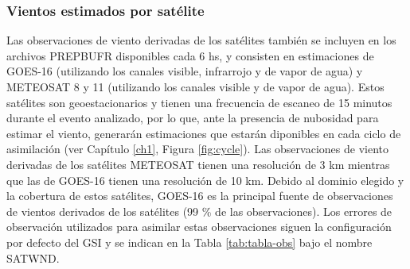 \documentclass[12pt,oneside,a4paper]{reedthesis}
\begin{document}
\hypertarget{vientos-estimados-por-satuxe9lite}{%
\subsubsection{Vientos estimados por satélite}\label{vientos-estimados-por-satuxe9lite}}

Las observaciones de viento derivadas de los satélites también se incluyen en los archivos PREPBUFR disponibles cada 6 hs, y consisten en estimaciones de GOES-16 (utilizando los canales visible, infrarrojo y de vapor de agua) y METEOSAT 8 y 11 (utilizando los canales visible y de vapor de agua). Estos satélites son geoestacionarios y tienen una frecuencia de escaneo de 15 minutos durante el evento analizado, por lo que, ante la presencia de nubosidad para estimar el viento, generarán estimaciones que estarán diponibles en cada ciclo de asimilación (ver Capítulo \ref{ch1}, Figura \ref{fig:cycle}). Las observaciones de viento derivadas de los satélites METEOSAT tienen una resolución de 3 km mientras que las de GOES-16 tienen una resolución de 10 km. Debido al dominio elegido y la cobertura de estos satélites, GOES-16 es la principal fuente de observaciones de vientos derivados de los satélites (99 \% de las observaciones). Los errores de observación utilizados para asimilar estas observaciones siguen la configuración por defecto del GSI y se indican en la Tabla \ref{tab:tabla-obs} bajo el nombre SATWND.
\end{document}
